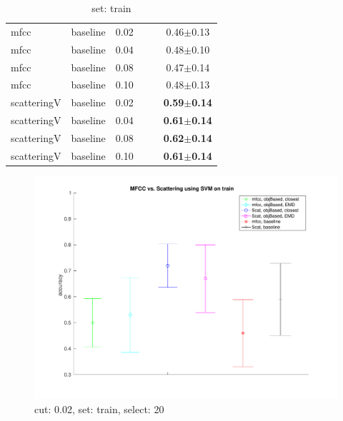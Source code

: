 \documentclass[12pt,a4paper,fleqn]{tufte-handout}
\begin{document}
\begin{table}
\begin{center}
\begin{tabular}{lllllc}
mfcc & baseline & 0.02 &  &  & 0.46$\pm$0.13 \\   
mfcc & baseline & 0.04 &  &  & 0.48$\pm$0.10 \\   
mfcc & baseline & 0.08 &  &  & 0.47$\pm$0.14 \\   
mfcc & baseline & 0.10 &  &  & 0.48$\pm$0.13 \\   
scatteringV & baseline & 0.02 &  &  & \textbf{0.59$\pm$0.14} \\   
scatteringV & baseline & 0.04 &  &  & \textbf{0.61$\pm$0.14} \\   
scatteringV & baseline & 0.08 &  &  & \textbf{0.62$\pm$0.14} \\   
scatteringV & baseline & 0.10 &  &  & \textbf{0.61$\pm$0.14} \\   
\end{tabular}   
\end{center}   
\caption{set: train}   
\label{settr}   
\end{table}   
 
 
\begin{center}  
\begin{figure}  
\centering  
\includegraphics[width=\textwidth,height=0.8\textheight,keepaspectratio]{./figures/Fig5.pdf}  
\caption{cut: 0.02, set: train, select: 20}  
\label{cut0.02SettrSel20}  
\end{figure}  
\end{center}  
 
 
  
\end{document}
